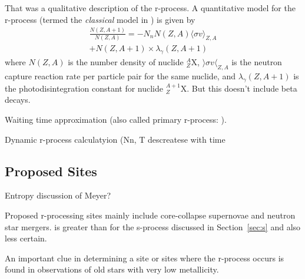 That was a qualitative description of the r-process.  A quantitative
model for the r-process (termed the {\it classical} model
in \citealt{iliadis2008}) is given by
\begin{multline}
\frac{N(Z,A+1)}{N(Z,A)} = - N_nN(Z,A) \langle \sigma v \rangle_{Z,A} \\
+N(Z,A+1)\times\lambda_\gamma (Z,A+1)
\end{multline}
where $N(Z,A)$ is the number density of  nuclide $^A_Z$X, $\rangle 
\sigma v \langle_{Z,A}$ is the neutron
capture reaction rate per particle pair for the same nuclide, and
$\lambda_\gamma (Z,A+1)$ is the photodisintegration constant for
nuclide  $^{A+1}_{Z}$X.  But this doesn't include beta decays.

Waiting time approximation (also called primary r-process: \citealt{meyer1994}).

Dynamic r-process calculatyion (Nn, T descreatese with time


\subsection{Proposed Sites}

Entropy discussion of Meyer?

Proposed r-processing sites mainly include core-collapse supernovae
and neutron star mergers.  is greater than for
the s-process discussed in Section~\ref{sec:s} and also less certain.  

An important clue in determining a site or sites where the r-process
occurs is found in observations of old stars with very low
metallicity.   
